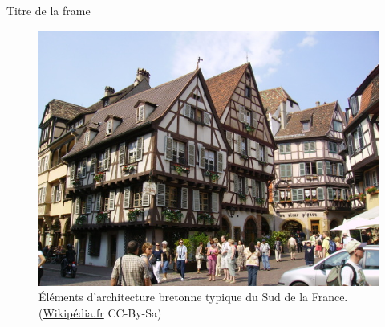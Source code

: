 \documentclass{bredelebeamer}
\begin{document}
\begin{frame}{Titre de la frame} 

\begin{figure}
\centering
\includegraphics[scale=0.5]{images/architecturebretonne_wikipedia.jpg}
\caption{Éléments d'architecture bretonne typique du Sud de la France. (\href{http://commons.wikimedia.org/wiki/File:Colmar_-_Alsace.jpg}{Wikipédia.fr} CC-By-Sa)}
\end{figure}

\end{frame}
\end{document}
